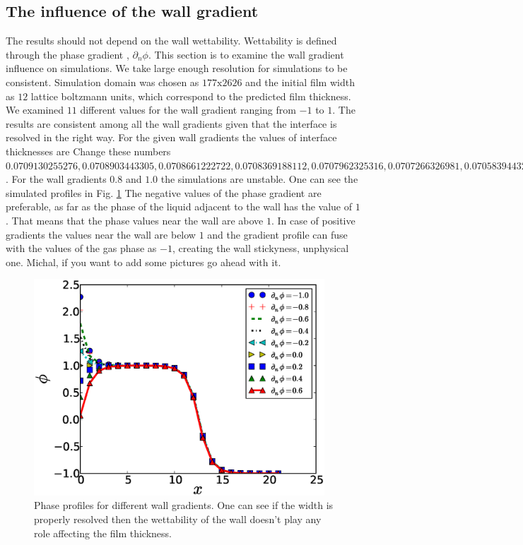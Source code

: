 \documentclass{article}
\begin{document}
\subsection{The influence of the wall gradient}
The results should not depend on the wall wettability. Wettability is defined
through the phase gradient \cite{pooley-contact}, $\partial_n \phi$. This
section is to examine the wall gradient influence on simulations. We take large
enough resolution for simulations to be consistent. Simulation domain was
chosen as $177\mathrm{x}2626$ and the initial film width as
$12$ lattice boltzmann units, which correspond to the predicted film thickness.
We examined $11$ different values for the wall
gradient ranging from $-1$ to $1$. The results are consistent among all the
wall gradients given that the interface is resolved in the right way. For the
given wall gradients the values of interface thicknesses are
{\color{red} Change these numbers $0.0709130255276, 0.0708903443305,
0.0708661222722,
0.0708369188112, 0.0707962325316, 0.0707266326981, 0.0705839443249,
0.0702489349415, 0.0697553433989$}. For the wall gradients $0.8$ and $1.0$ the
simulations are unstable. One can see the simulated profiles in Fig.
\ref{fig:gradients:profiles} The negative values of the phase gradient are
preferable, as
far as the phase of the liquid adjacent to the wall has the value of $1$. That
means that the phase values near the wall are above $1$. In case of positive
gradients the values near the wall are below $1$ and the gradient profile can
fuse with the values of the gas phase as $-1$, creating the wall stickyness,
unphysical one. {\color{red} Michal, if you want to add some pictures go ahead
with it}.
\begin{figure}
\includegraphics[width=0.97\textwidth]{Figures/Wall/phase_grad_profiles.eps}
\caption{Phase profiles for different wall gradients. One can see if the width
is properly resolved then the wettability of the wall doesn't play any role
affecting the film thickness.
\label{fig:gradients:profiles}
}
\end{figure}
\end{document}
